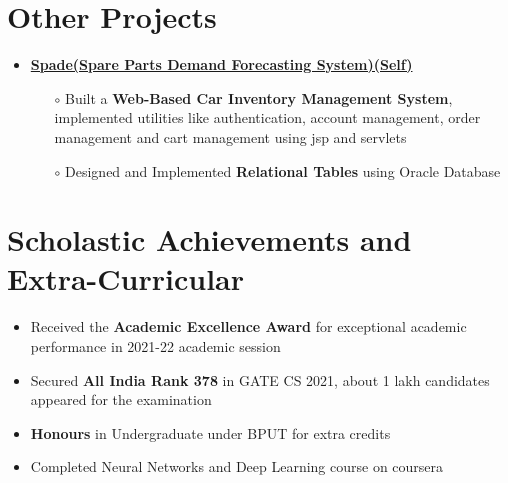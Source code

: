 \documentclass[10.8pt, a4paper]{extarticle}
\newcommand{\shorterSection}[1]{\vspace{-10pt}\section{#1}}
\begin{document}
\shorterSection{Other Projects}
\vspace{-2pt}
\begin{itemize}
     \item\href{https://github.com/jeetsarangi/spade}{\textbf{Spade(Spare Parts Demand Forecasting System)(Self)}}\hfill
    \\[-0.6cm]
    \begin{itemize}
	      \item [$\circ$]Built a \textbf {Web-Based Car Inventory Management System}, implemented utilities like authentication, account management, order management and cart management using jsp and servlets\\[-0.6cm]
	      \item [$\circ$] Designed and Implemented \textbf{Relational Tables} using Oracle Database
	\end{itemize}
	\end{itemize}
\medskip


\shorterSection{Scholastic Achievements and Extra-Curricular}
\begin{itemize}
  \item Received the \textbf{Academic Excellence Award} for exceptional academic performance in 2021-22 academic session\\[-0.6cm]
  \item Secured \textbf{All India Rank 378} in GATE CS 2021, about 1 lakh candidates appeared for the examination\\[-0.6cm]
  \item \textbf{Honours} in Undergraduate under BPUT for extra credits\\[-0.6cm]
  \item Completed Neural Networks and Deep Learning course on coursera
\end{itemize}
\medskip
\end{document}
